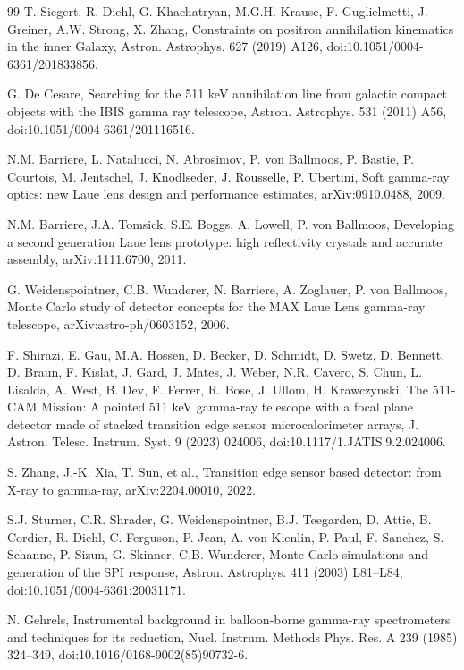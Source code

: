 \documentclass[11pt]{article}
\begin{document}
\begin{thebibliography}{99}
T. Siegert, R. Diehl, G. Khachatryan, M.G.H. Krause, F. Guglielmetti, J. Greiner, A.W. Strong, X. Zhang, Constraints on positron annihilation kinematics in the inner Galaxy, Astron. Astrophys. 627 (2019) A126, doi:10.1051/0004-6361/201833856.

G. De Cesare, Searching for the 511 keV annihilation line from galactic compact objects with the IBIS gamma ray telescope, Astron. Astrophys. 531 (2011) A56, doi:10.1051/0004-6361/201116516.

N.M. Barriere, L. Natalucci, N. Abrosimov, P. von Ballmoos, P. Bastie, P. Courtois, M. Jentschel, J. Knodlseder, J. Rousselle, P. Ubertini, Soft gamma-ray optics: new Laue lens design and performance estimates, arXiv:0910.0488, 2009.

N.M. Barriere, J.A. Tomsick, S.E. Boggs, A. Lowell, P. von Ballmoos, Developing a second generation Laue lens prototype: high reflectivity crystals and accurate assembly, arXiv:1111.6700, 2011.

G. Weidenspointner, C.B. Wunderer, N. Barriere, A. Zoglauer, P. von Ballmoos, Monte Carlo study of detector concepts for the MAX Laue Lens gamma-ray telescope, arXiv:astro-ph/0603152, 2006.

F. Shirazi, E. Gau, M.A. Hossen, D. Becker, D. Schmidt, D. Swetz, D. Bennett, D. Braun, F. Kislat, J. Gard, J. Mates, J. Weber, N.R. Cavero, S. Chun, L. Lisalda, A. West, B. Dev, F. Ferrer, R. Bose, J. Ullom, H. Krawczynski, The 511-CAM Mission: A pointed 511 keV gamma-ray telescope with a focal plane detector made of stacked transition edge sensor microcalorimeter arrays, J. Astron. Telesc. Instrum. Syst. 9 (2023) 024006, doi:10.1117/1.JATIS.9.2.024006.

S. Zhang, J.-K. Xia, T. Sun, et al., Transition edge sensor based detector: from X-ray to gamma-ray, arXiv:2204.00010, 2022.

S.J. Sturner, C.R. Shrader, G. Weidenspointner, B.J. Teegarden, D. Attie, B. Cordier, R. Diehl, C. Ferguson, P. Jean, A. von Kienlin, P. Paul, F. Sanchez, S. Schanne, P. Sizun, G. Skinner, C.B. Wunderer, Monte Carlo simulations and generation of the SPI response, Astron. Astrophys. 411 (2003) L81--L84, doi:10.1051/0004-6361:20031171.

N. Gehrels, Instrumental background in balloon-borne gamma-ray spectrometers and techniques for its reduction, Nucl. Instrum. Methods Phys. Res. A 239 (1985) 324--349, doi:10.1016/0168-9002(85)90732-6.


\end{thebibliography}
\end{document}
